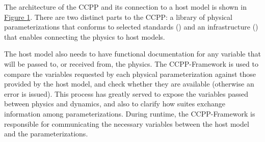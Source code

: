 \documentclass[letterpaper,10pt,english]{sphinxmanual}
\begin{document}
The architecture of the CCPP and its connection to a host model is shown in
\hyperref[\detokenize{Overview:ccpp-arch-host}]{Figure \ref{\detokenize{Overview:ccpp-arch-host}}}.
There are two distinct parts to the CCPP: a library of physical parameterizations
that conforms to selected standards () and an infrastructure ()
that enables connecting the physics to host models.

\begin{figure}[htbp]
\centering
\capstart

\noindent{}
\caption{}\label{\detokenize{Overview:id1}}\label{\detokenize{Overview:ccpp-arch-host}}\end{figure}

The host model also needs to have functional documentation for any variable that will be
passed to, or received from, the physics. The CCPP-Framework is used to compare the variables
requested by each physical parameterization against those provided by the host model, and
check whether they are available (otherwise an error is issued).  This process has greatly
served to expose the variables passed between physics and dynamics, and also to clarify
how suites exchange information among parameterizations. During runtime, the CCPP-Framework
is responsible for communicating the necessary variables between the host model and the
parameterizations.
\end{document}
